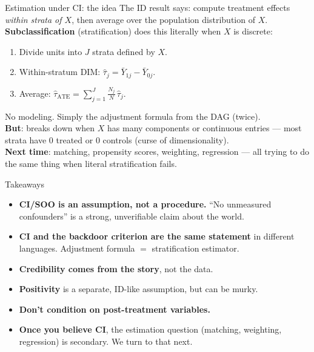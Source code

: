 \documentclass[xcolor=dvipsnames]{beamer}
\begin{document}
\begin{frame}{Estimation under CI: the idea}
\small
{} The ID result says: compute treatment effects \textit{within strata of $X$}, then average over the population distribution of $X$.\\[4pt]
\medskip
{} \textbf{Subclassification} (stratification) does this literally when $X$ is discrete:
\begin{enumerate}
\footnotesize
\item Divide units into $J$ strata defined by $X$.
\item Within-stratum DIM: $\hat\tau_j = \bar Y_{1j} - \bar Y_{0j}$.
\item Average: $\hat\tau_{\text{ATE}} = \sum_{j=1}^J \frac{N_j}{N}\, \hat\tau_j$.
\end{enumerate}

\medskip
{} No modeling.  Simply the  adjustment formula from the DAG (twice).\\[4pt]

 \textbf{But}: breaks down when $X$ has many components or continuous entries --- most strata have 0 treated or 0 controls (curse of dimensionality).\\
\bigskip
{} \textbf{Next time}: matching, propensity scores, weighting, regression --- all trying to do the same thing when literal stratification fails.
\end{frame}


\begin{frame}{Takeaways}
\small
\begin{itemize}
\item<1-> \textbf{CI/SOO is an assumption, not a procedure.}  ``No unmeasured confounders'' is a strong, unverifiable claim about the world.
\medskip
\item<2-> \textbf{CI and the backdoor criterion are the same statement} in different languages.  Adjustment formula $=$ stratification estimator.
\medskip
\item<3-> \textbf{Credibility comes from the story}, not the data.
\medskip
\item<4-> \textbf{Positivity} is a separate, ID-like assumption, but can be murky.
\medskip
\item<5-> \textbf{Don't condition on post-treatment variables.}
\medskip
\item<6-> \textbf{Once you believe CI}, the estimation question (matching, weighting, regression) is secondary.  We turn to that next.
\end{itemize}
\end{frame}
\end{document}
